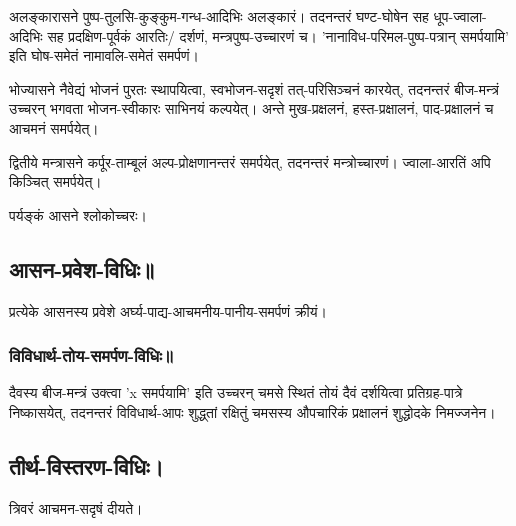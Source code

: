 \documentclass[oneside, article]{memoir}
\begin{document}
अलङ्कारासने पुष्प-तुलसि-कुङ्कुम-गन्ध-आदिभिः अलङ्कारं। तदनन्तरं घण्ट-घोषेन सह धूप-ज्वाला-अदिभिः सह प्रदक्षिण-पूर्वकं आरतिः/ दर्शणं, मन्त्रपुष्प-उच्चारणं च। 'नानाविध-परिमल-पुष्प-पत्रान् समर्पयामि' इति घोष-समेतं नामावलि-समेतं समर्पणं। 

भोज्यासने नैवेद्यं भोजनं पुरतः स्थापयित्वा, स्वभोजन-सदृशं तत्-परिसिञ्चनं कारयेत्, तदनन्तरं बीज-मन्त्रं उच्चरन् भगवता भोजन-स्वीकारः साभिनयं कल्पयेत्। अन्ते मुख-प्रक्षलनं, हस्त-प्रक्षालनं, पाद-प्रक्षालनं च आचमनं समर्पयेत्।

द्वितीये मन्त्रासने कर्पूर-ताम्बूलं अल्प-प्रोक्षणानन्तरं समर्पयेत्, तदनन्तरं मन्त्रोच्चारणं। ज्वाला-आरतिं अपि किञ्चित् समर्पयेत्।

पर्यङ्कं आसने श्लोकोच्चरः।

\subsection{आसन-प्रवेश-विधिः॥}
प्रत्येके आसनस्य प्रवेशे अर्घ्य-पाद्य-आचमनीय-पानीय-समर्पणं क्रीयं।

\subsubsection{विविधार्थ-तोय-समर्पण-विधिः॥}
दैवस्य बीज-मन्त्रं उक्त्वा 'x समर्पयामि' इति उच्चरन् चमसे स्थितं‌ तोयं दैवं दर्शयित्वा प्रतिग्रह-पात्रे निष्कासयेत्, तदनन्तरं विविधार्थ-आपः शुद्ध्तां रक्षितुं चमसस्य औपचारिकं प्रक्षालनं शुद्धोदके निमज्जनेन।

\subsection{तीर्थ-विस्तरण-विधिः।}
त्रिवरं आचमन-सदृषं दीयते। 
\end{document}
